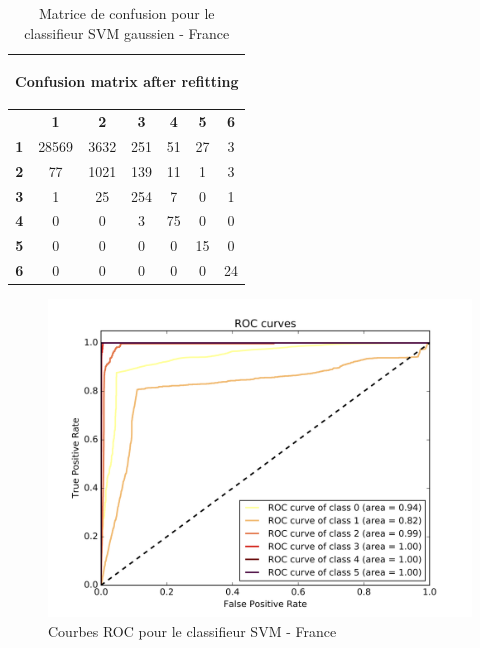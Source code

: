 \documentclass{book}
\begin{document}
\begin{table}[H]
  \begin{center}
\begin{adjustbox}{max width=\textwidth}
  \begin{tabular}{|c|c|c|c|c|c|c|}
    \hline
    \multicolumn{7}{|c|}{{ \begin{bf}Confusion matrix after refitting\end{bf}}} \\
    \hline
     & \textbf{1} & \textbf{2} & \textbf{3} & \textbf{4} & \textbf{5} & \textbf{6}\\
    \hline
    \textbf{1} & 28569 & 3632 & 251 & 51 & 27 & 3\\
    \hline
    \textbf{2} & 77 & 1021 & 139 & 11 & 1 & 3\\
    \hline
    \textbf{3} & 1 & 25 & 254 & 7 & 0 & 1\\
    \hline
    \textbf{4} & 0 & 0 & 3 & 75 & 0 & 0\\
    \hline
    \textbf{5} & 0 & 0 & 0 & 0 & 15 & 0\\
    \hline
    \textbf{6} & 0 & 0 & 0 & 0 & 0 & 24\\
    \hline
  \end{tabular}
  \end{adjustbox}
  \caption{Matrice de confusion pour le classifieur SVM gaussien - France}
  \label{svm_cm}
  \end{center}
\end{table}

\begin{figure}[H]
 \begin{center}
\includegraphics[scale=0.4]{../../data/France/test/Support_Vector_Gaussian_Classification/Support_Vector_Gaussian_Classification_roc.png}
 \caption{Courbes ROC pour le classifieur SVM - France}
 \label{svm_roc}
 \end{center}
\end{figure}
\end{document}
